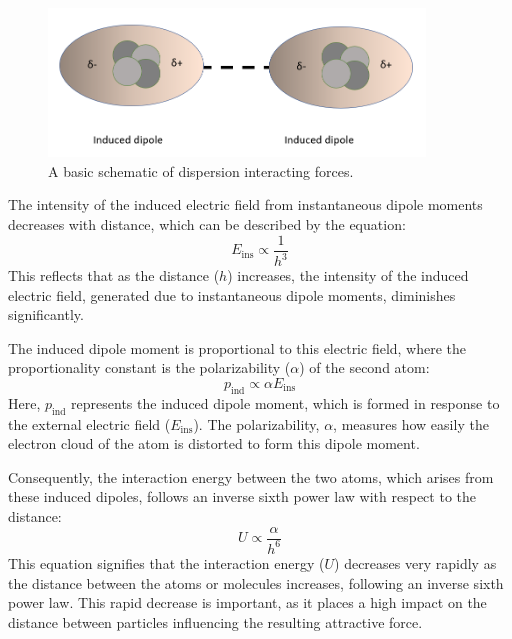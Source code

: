 \begin{figure}[h!!!]     %
        \begin{center}
          \includegraphics[width=100mm]{chapter1/London.PNG}
\end{center}
\caption{A basic schematic of dispersion interacting forces.}
\label{fig:dispy}                 %
\end{figure}

The intensity of the induced electric field from instantaneous dipole moments decreases with distance, which can be described by the equation:
\begin{equation}
E_{\text{ins}} \propto \frac{1}{h^3}
\end{equation}
This reflects that as the distance (\(h\)) increases, the intensity of the induced electric field, generated due to instantaneous dipole moments, diminishes significantly.

The induced dipole moment is proportional to this electric field, where the proportionality constant is the polarizability (\(\alpha\)) of the second atom:
\begin{equation}
p_{\text{ind}} \propto \alpha E_{\text{ins}}
\end{equation}
Here, \(p_{\text{ind}}\) represents the induced dipole moment, which is formed in response to the external electric field (\(E_{\text{ins}}\)). The polarizability, \(\alpha\), measures how easily the electron cloud of the atom is distorted to form this dipole moment.

Consequently, the interaction energy between the two atoms, which arises from these induced dipoles, follows an inverse sixth power law with respect to the distance:
\begin{equation}
U \propto \frac{\alpha}{h^6}
\end{equation}
This equation signifies that the interaction energy (\(U\)) decreases very rapidly as the distance between the atoms or molecules increases, following an inverse sixth power law. This rapid decrease is important, as it places a high impact on the distance between particles influencing the resulting attractive force.


